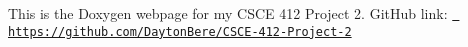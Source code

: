 This is the Doxygen webpage for my CSCE 412 Project 2. Git\+Hub link\+: \href{https://github.com/DaytonBere/CSCE-412-Project-2}{\texttt{ https\+://github.\+com/\+Dayton\+Bere/\+CSCE-\/412-\/\+Project-\/2}} 